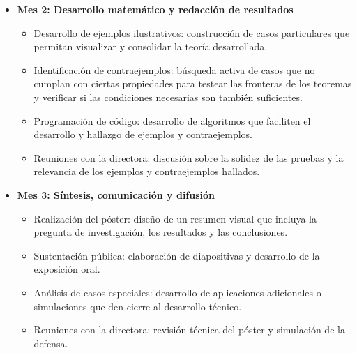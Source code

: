 \documentclass{article}
\begin{document}
\begin{itemize}
\begin{itemize}
\begin{itemize}
                   \item Redacción de preliminares: escritura en \LaTeX\ de los conceptos básicos, definiciones técnicas y notación que se utilizarán a lo largo del trabajo.
                   \item Consolidación del marco teórico: redacción de la introducción y el contexto histórico del tema de estudio.
                \end{itemize}
             \item \textbf{Mes 2: Desarrollo matemático y redacción de resultados}
                \begin{itemize}
                    demostraciones formales de los teoremas y proposiciones centrales de la tesis.
                   \item Desarrollo de ejemplos ilustrativos: construcción de casos particulares que permitan visualizar y consolidar la teoría desarrollada.
                   \item Identificación de contraejemplos: búsqueda activa de casos que no cumplan con ciertas propiedades para testear las fronteras de los teoremas y verificar si las condiciones necesarias son también suficientes.
                   \item Programación de código: desarrollo de algoritmos que faciliten el desarrollo y hallazgo de ejemplos y contraejemplos.
                   \item Reuniones con la directora: discusión sobre la solidez de las pruebas y la relevancia de los ejemplos y contraejemplos hallados.
                \end{itemize}
             \item \textbf{Mes 3: Síntesis, comunicación y difusión}
                \begin{itemize}
                   \item Realización del póster: diseño de un resumen visual que incluya la pregunta de investigación, los resultados y las conclusiones.
                   \item Sustentación pública: elaboración de diapositivas y desarrollo de la exposición oral.
                   \item Análisis de casos especiales: desarrollo de aplicaciones adicionales o simulaciones que den cierre al desarrollo técnico.
                   \item Reuniones con la directora: revisión técnica del póster y simulación de la defensa.
                \end{itemize}

\end{itemize}
\end{itemize}
\end{document}
